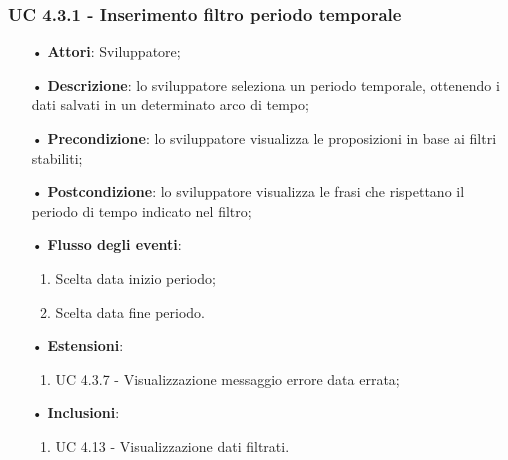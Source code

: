 \subsubsection{UC 4.3.1 - Inserimento filtro periodo temporale}
\begin{itemize}
	\item[•]\textbf{Attori}: Sviluppatore;
	\item[•]\textbf{Descrizione}: lo sviluppatore seleziona un periodo temporale, ottenendo i dati salvati in un determinato arco di tempo;
	\item[•]\textbf{Precondizione}: lo sviluppatore visualizza le proposizioni in base ai filtri stabiliti;
	\item[•]\textbf{Postcondizione}: lo sviluppatore visualizza le frasi che rispettano il periodo di tempo indicato nel filtro;
	\item[•]\textbf{Flusso degli eventi}: 
	\begin{enumerate}
		\item Scelta data inizio periodo;
		\item Scelta data fine periodo.
	\end{enumerate}
	\item[•]\textbf{Estensioni}: 
	\begin{enumerate}
		\item UC 4.3.7 - Visualizzazione messaggio errore data errata;
	\end{enumerate}
	\item[•]\textbf{Inclusioni}:
	\begin{enumerate}
		\item UC 4.13 - Visualizzazione dati filtrati.
	\end{enumerate}
\end{itemize}

